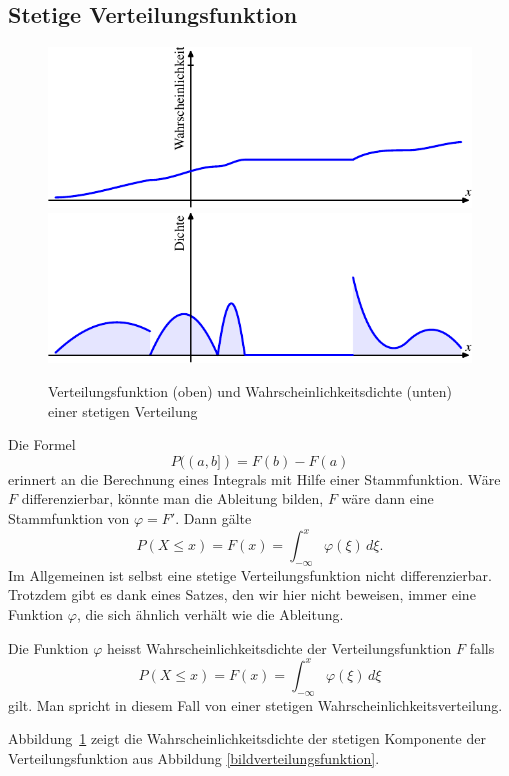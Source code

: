 \subsection{Stetige Verteilungsfunktion}
\begin{figure}
\begin{center}
\includegraphics{images/verteilungsfunktion-4}
\includegraphics{images/verteilungsfunktion-6}
\end{center}
\caption{Verteilungsfunktion (oben) und Wahrscheinlichkeitsdichte 
(unten) einer stetigen Verteilung\label{bildstetigeverteilungsfunktion}}
\end{figure}
Die Formel
\[
P((a,b])=F(b)-F(a)
\]
erinnert an die Berechnung eines Integrals mit Hilfe einer
Stammfunktion.
Wäre $F$ differenzierbar, könnte man die Ableitung bilden,
$F$ wäre dann eine Stammfunktion von $\varphi=F'$.
Dann gälte
\[
P(X\le x)=F(x)=\int_{-\infty}^x\varphi(\xi)\,d\xi.
\]
Im Allgemeinen ist selbst eine stetige Verteilungsfunktion nicht
differenzierbar.
Trotzdem gibt es dank eines Satzes, den wir hier nicht beweisen,
immer eine Funktion $\varphi$, die sich ähnlich verhält wie die
Ableitung.
\begin{definition}
Die Funktion $\varphi$ heisst Wahrscheinlichkeitsdichte der Verteilungsfunktion
$F$ falls
\[
P(X\le x)=F(x)=\int_{-\infty}^x\varphi(\xi)\,d\xi
\]
gilt.
Man spricht in diesem Fall von einer stetigen Wahrscheinlichkeitsverteilung.
\end{definition}
Abbildung~\ref{bildstetigeverteilungsfunktion} zeigt die
Wahrscheinlichkeitsdichte der stetigen Komponente der Verteilungsfunktion
aus Abbildung \ref{bildverteilungsfunktion}.

